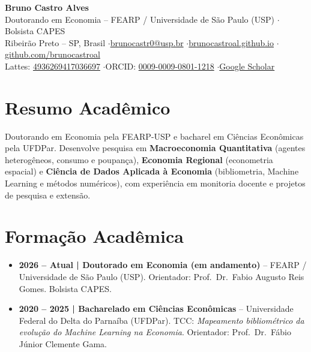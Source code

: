 \documentclass[10pt,a4paper]{article}
\begin{document}
{\LARGE \textbf{Bruno Castro Alves}}\\[2pt]
{\small \color{muted} Doutorando em Economia -- FEARP / Universidade de São Paulo (USP) \quad$\cdot$\quad Bolsista CAPES}\\[1pt]
{\footnotesize Ribeirão Preto -- SP, Brasil \quad$\cdot$\quad \href{mailto:brunocastr0@usp.br}{brunocastr0@usp.br} \quad$\cdot$\quad \href{https://brunocastroal.github.io}{brunocastroal.github.io} \quad$\cdot$\quad \href{https://github.com/brunocastroal}{github.com/brunocastroal}}\\
{\footnotesize Lattes: \href{http://lattes.cnpq.br/4936269417036697}{4936269417036697} \quad$\cdot$\quad ORCID: \href{https://orcid.org/0009-0009-0801-1218}{0009-0009-0801-1218} \quad$\cdot$\quad \href{https://scholar.google.com.br/citations?user=G48yrGsAAAAJ&hl=pt-BR&oi=ao}{Google Scholar}}

\section{Resumo Acadêmico}
{\small Doutorando em Economia pela FEARP-USP e bacharel em Ciências Econômicas pela UFDPar. Desenvolve pesquisa em \textbf{Macroeconomia Quantitativa} (agentes heterogêneos, consumo e poupança), \textbf{Economia Regional} (econometria espacial) e \textbf{Ciência de Dados Aplicada à Economia} (bibliometria, Machine Learning e métodos numéricos), com experiência em monitoria docente e projetos de pesquisa e extensão.}

\section{Formação Acadêmica}
\begin{itemize}\small
  \item \textbf{2026 -- Atual | Doutorado em Economia (em andamento)} -- FEARP / Universidade de São Paulo (USP). Orientador: Prof.\ Dr.\ Fabio Augusto Reis Gomes. Bolsista CAPES.
  \item \textbf{2020 -- 2025 | Bacharelado em Ciências Econômicas} -- Universidade Federal do Delta do Parnaíba (UFDPar). TCC: \textit{Mapeamento bibliométrico da evolução do Machine Learning na Economia}. Orientador: Prof.\ Dr.\ Fábio Júnior Clemente Gama.
\end{itemize}

\end{document}
